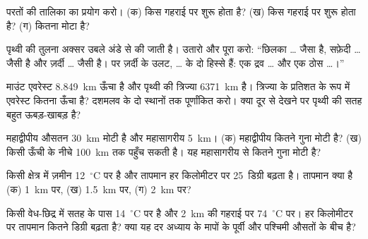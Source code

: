 \begin{exercise}[$\star$]\label{exo:g6:inside-the-earth:3}
परतों की तालिका का प्रयोग करो। (क)  किस गहराई पर शुरू होता है?
(ख)  किस गहराई पर शुरू होता है? (ग)  कितना
मोटा है?
\end{exercise}

\begin{exercise}[$\star$]\label{exo:g6:inside-the-earth:4}
पृथ्वी की तुलना अक्सर उबले अंडे से की जाती है। उतारो और पूरा करो: ``छिलका
\ldots{} जैसा है, सफ़ेदी \ldots{} जैसी है और ज़र्दी
\ldots{} जैसी है। पर ज़र्दी के उलट, \ldots{} के दो हिस्से हैं: एक द्रव
\ldots{} और एक ठोस \ldots{}।''
\end{exercise}

\begin{exercise}[$\star\star$]\label{exo:g6:inside-the-earth:5}
माउंट एवरेस्ट 8.849~km ऊँचा है और पृथ्वी की त्रिज्या 6371~km है। त्रिज्या के
प्रतिशत के रूप में एवरेस्ट कितना ऊँचा है? दशमलव के दो स्थानों तक पूर्णांकित करो।
क्या दूर से देखने पर पृथ्वी की सतह बहुत ऊबड़-खाबड़ है?
\end{exercise}

\begin{exercise}[$\star\star$]\label{exo:g6:inside-the-earth:6}
महाद्वीपीय  औसतन 30~km मोटी है और महासागरीय 
5~km। (क) महाद्वीपीय  कितने गुना मोटी है? (ख) किसी ऊँची
 के नीचे  100~km तक पहुँच सकती है। यह महासागरीय  से
कितने गुना मोटी है?
\end{exercise}

\begin{exercise}[$\star\star$]\label{exo:g6:inside-the-earth:7}
किसी क्षेत्र में ज़मीन 12~$^\circ$C पर है और तापमान हर किलोमीटर पर
25~डिग्री बढ़ता है। तापमान क्या है (क) 1~km पर, (ख)
1.5~km पर, (ग) 2~km पर?
\end{exercise}

\begin{exercise}[$\star\star$]\label{exo:g6:inside-the-earth:8}
किसी वेध-छिद्र में  सतह के पास 14~$^\circ$C पर है और
2~km की गहराई पर 74~$^\circ$C पर। हर किलोमीटर पर तापमान कितने डिग्री
बढ़ता है? क्या यह दर अध्याय के मापों के पूर्वी और पश्चिमी
औसतों के बीच है?
\end{exercise}

